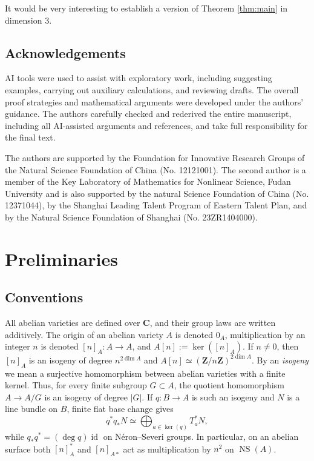 \documentclass[12pt]{amsart}
\numberwithin{equation}{section}
\theoremstyle{definition}
\theoremstyle{remark}
\newcommand{\C}{\mathbf C}
\newcommand{\Z}{\mathbf Z}
\newcommand{\NS}{\operatorname{NS}}
\begin{document}
It would be very interesting to establish a version of Theorem \ref{thm:main} in dimension $3$.

\subsection*{Acknowledgements}
AI tools were used to assist with exploratory work, including suggesting examples, carrying out auxiliary calculations, and reviewing drafts. The overall proof strategies and mathematical arguments were developed under the authors' guidance. The authors carefully checked and rederived the entire manuscript, including all AI-assisted arguments and references, and take full responsibility for the final text.

 The authors are supported by the Foundation for Innovative Research Groups of the Natural Science Foundation of China (No. 12121001). The second author is a member of the Key Laboratory of Mathematics for
Nonlinear Science, Fudan University and is also supported by the natural Science Foundation of China (No. 12371044), by the Shanghai Leading Talent Program of Eastern Talent Plan, and by the Natural Science Foundation of Shanghai (No. 23ZR1404000).
\section{Preliminaries}\label{sec:prelim}

\subsection{Conventions}
\label{subsec:conventions}

All abelian varieties are defined over $\C$, and their group laws are
written additively.  The origin of an abelian variety $A$ is denoted
$0_A$, multiplication by an integer $n$ is denoted
$[n]_A:A\to A$, and $A[n]:=\ker([n]_A)$.  If $n\neq0$, then $[n]_A$ is
an  isogeny of degree $n^{2\dim A}$ and
$A[n]\simeq(\Z/n\Z)^{2\dim A}$.  By an \emph{isogeny} we mean a
surjective homomorphism between abelian varieties with a finite kernel.  Thus,
for every finite subgroup $G\subset A$, the quotient homomorphism
$A\to A/G$ is an  isogeny of degree $|G|$.
If $q:B\to A$ is such an isogeny and $N$ is a line bundle on $B$, finite
flat base change gives
\[
  q^*q_*N\simeq\bigoplus_{a\in\ker(q)}T_a^*N,
\]
while $q_*q^*=(\deg q)\operatorname{id}$ on N\'eron--Severi groups.  In
particular, on an abelian surface both $[n]_A^*$ and $[n]_{A*}$ act as
multiplication by $n^2$ on $\NS(A)$.
\end{document}

